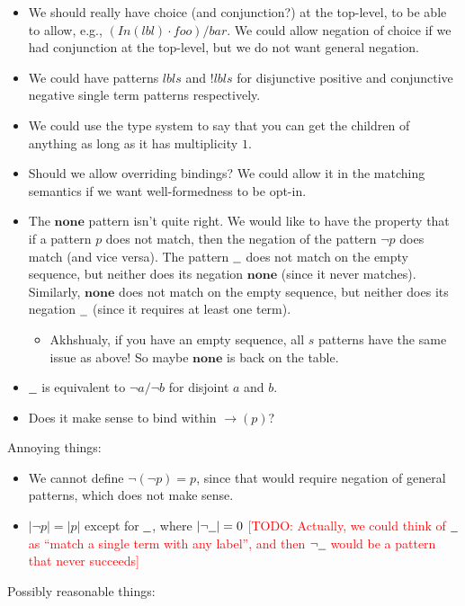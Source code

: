 \documentclass{article}
\newcommand{\RED}[1]{\textcolor{red}{#1}}
\newcommand{\TODO}[1]{\RED{[TODO: #1]}}
\newcommand{\lbl}{\ensuremath{\mathit{lbl}}}
\newcommand{\pseq}[2]{\ensuremath{#1 \cdot #2}}
\newcommand{\por}[2]{\ensuremath{#1/#2}}
\newcommand{\pnot}[1]{\ensuremath{\lnot #1}}
\newcommand{\any}{\ensuremath{\text{\underline{\hspace{0.6em}}}}}
\newcommand{\none}{\ensuremath{\mathbf{none}}}
\newcommand{\fb}[1]{\ensuremath{\mathop{\rightarrow}(#1)}}
\newcommand{\pin}[1]{\ensuremath{\mathit{In}(#1)}}
\begin{document}
\begin{itemize}
\item We should really have choice (and conjunction?) at the
  top-level, to be able to allow, e.g.,
  $\por{(\pseq{\pin{\lbl}}{\mathit{foo}})}{bar}$. We could allow
  negation of choice if we had conjunction at the top-level, but
  we do not want general negation.
\item We could have patterns $\mathit{lbls}$ and $!\mathit{lbls}$
  for disjunctive positive and conjunctive negative single term
  patterns respectively.
\item We could use the type system to say that you can get the
  children of anything as long as it has multiplicity $1$.
\item Should we allow overriding bindings? We could allow it in
  the matching semantics if we want well-formedness to be opt-in.
\item The \none{} pattern isn't quite right. We would like to have
  the property that if a pattern $p$ does not match, then the
  negation of the pattern \pnot{p} does match (and vice versa).
  The pattern \any{} does not match on the empty sequence, but
  neither does its negation \none{} (since it never matches).
  Similarly, \none{} does not match on the empty sequence, but
  neither does its negation \any{} (since it requires at least one
  term).
  \begin{itemize}
  \item Akhshualy, if you have an empty sequence, all $s$ patterns
    have the same issue as above! So maybe \none{} is back on the
    table.
  \end{itemize}
\item \any{} is equivalent to \por{\pnot{a}}{\pnot{b}} for
  disjoint $a$ and $b$.
\item Does it make sense to bind within $\fb{p}$?
\end{itemize}
%
Annoying things:

\begin{itemize}
\item We cannot define $\lnot(\lnot p) = p$, since that would
  require negation of general patterns, which does not make sense.
\item $|\lnot p| = |p|$ except for $\any$, where $|\lnot\any| = 0$
  \TODO{Actually, we could think of \any{} as ``match a single
    term with any label'', and then \pnot{\any{}} would be a
    pattern that never succeeds}
\end{itemize}
%
Possibly reasonable things:
\end{document}
